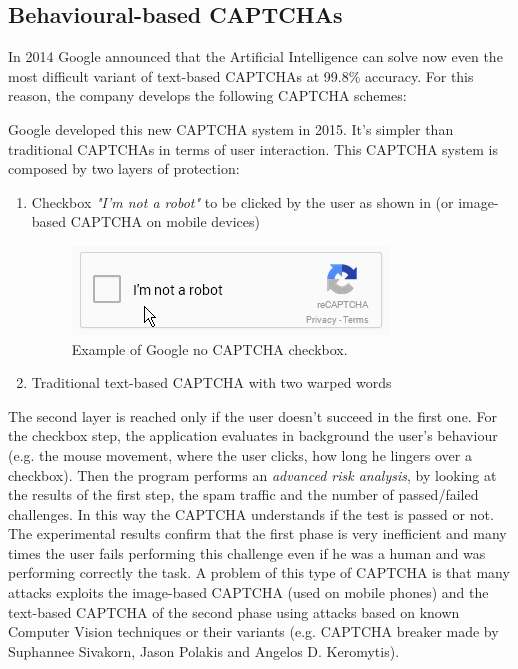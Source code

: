 \subsection{Behavioural-based CAPTCHAs}
In 2014 Google announced that the Artificial Intelligence can solve now even the most difficult variant of text-based CAPTCHAs at 99.8\% accuracy\cite{break_text}. For this reason, the company develops the following CAPTCHA schemes:
\begin{itemize}
{Google developed this new CAPTCHA system in 2015. It's simpler than traditional CAPTCHAs in terms of user interaction\cite{google}. This CAPTCHA system is composed by two layers of protection:
\begin{enumerate}
\item{Checkbox \textit{"I'm not a robot"} to be clicked by the user as shown in  (or image-based CAPTCHA on mobile devices)
\begin{figure}[h]
     \centering
     \includegraphics[width=.4\linewidth]{Images/StateOfArt/noCAPTCHA}
     \caption{\footnotesize{Example of Google no CAPTCHA checkbox.}}\label{soa:noCAPTCHA}
\end{figure}
}
\item{Traditional text-based CAPTCHA with two warped words}
\end{enumerate}
The second layer is reached only if the user doesn't succeed in the first one. For the checkbox step, the application evaluates in background the user's behaviour (e.g. the mouse movement, where the user clicks, how long he lingers over a checkbox). Then the program performs an \textit{advanced risk analysis}, by looking at the results of the first step, the spam traffic and the number of passed/failed challenges. In this way the CAPTCHA understands if the test is passed or not.\\
The experimental results confirm that the first phase is very inefficient and many times the user fails performing this challenge even if he was a human and was performing correctly the task. A problem of this type of CAPTCHA is that many attacks exploits the image-based CAPTCHA (used on mobile phones) and the text-based CAPTCHA of the second phase using attacks based on known Computer Vision techniques or their variants (e.g. CAPTCHA breaker made by Suphannee Sivakorn, Jason Polakis and Angelos D. Keromytis\cite{break_google}).
}
\end{itemize}
